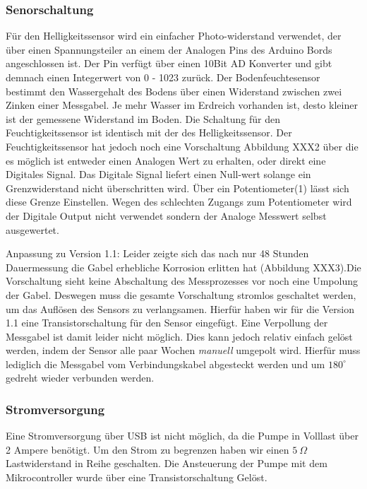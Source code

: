 \documentclass[]{IEEEtran}
\begin{document}
	\subsubsection{Senorschaltung} \label{sensorik}
	Für den Helligkeitssensor wird ein einfacher Photo-widerstand verwendet, der über einen Spannungsteiler an einem der Analogen Pins des Arduino Bords angeschlossen ist. Der Pin verfügt über einen 10Bit AD Konverter und gibt demnach einen Integerwert von 0 - 1023 zurück. 
	Der Bodenfeuchtesensor bestimmt den Wassergehalt des Bodens über einen Widerstand zwischen zwei Zinken einer Messgabel. Je mehr Wasser im Erdreich vorhanden ist, desto kleiner ist der gemessene Widerstand im Boden. Die Schaltung für den Feuchtigkeitssensor ist identisch mit der des Helligkeitssensor. Der Feuchtigkeitssensor hat jedoch noch eine Vorschaltung Abbildung XXX2 über die es möglich ist entweder einen Analogen Wert zu erhalten, oder direkt eine Digitales Signal. Das Digitale Signal liefert einen Null-wert solange ein Grenzwiderstand nicht überschritten wird. Über ein  Potentiometer(1) lässt sich diese Grenze Einstellen. Wegen des schlechten Zugangs zum Potentiometer wird der Digitale Output nicht verwendet sondern der Analoge Messwert selbst ausgewertet.
	
	Anpassung zu Version 1.1:
	Leider zeigte sich das nach nur 48 Stunden Dauermessung die Gabel erhebliche Korrosion erlitten hat (Abbildung XXX3).Die Vorschaltung sieht keine Abschaltung des Messprozesses vor noch eine Umpolung der Gabel. Deswegen muss die gesamte Vorschaltung stromlos geschaltet werden, um das Auflösen des Sensors zu verlangsamen. Hierfür haben wir für die Version 1.1 eine Transistorschaltung für den Sensor eingefügt. Eine Verpollung der Messgabel ist damit leider nicht möglich. Dies kann jedoch relativ einfach gelöst werden, indem der Sensor alle paar Wochen \emph{manuell} umgepolt wird. Hierfür muss lediglich die Messgabel vom Verbindungskabel abgesteckt werden und um 
	\begin{math}180^{\circ}\end{math} gedreht wieder verbunden werden. 
	
	\subsubsection{Stromversorgung}
	Eine Stromversorgung über USB ist nicht möglich, da die Pumpe in Volllast über 2 Ampere benötigt. Um den Strom zu begrenzen haben wir einen \begin{math}5~\Omega\end{math} Lastwiderstand in Reihe geschalten. Die Ansteuerung der Pumpe mit dem Mikrocontroller wurde über eine Transistorschaltung Gelöst. 
\end{document}
